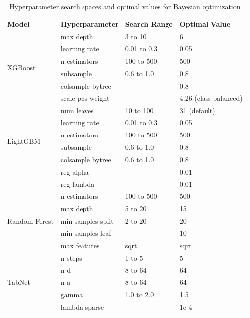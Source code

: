\documentclass[harvard,article]{frontiersinFPHY_FAMS}
\begin{document}
\begin{table}[H]
\centering
\caption{Hyperparameter search spaces and optimal values for Bayesian optimization}
\label{tab:hyperparameters}
\begin{tabular}{l l l l}
\toprule
\textbf{Model} & \textbf{Hyperparameter} & \textbf{Search Range} & \textbf{Optimal Value} \\
\midrule
\multirow{6}{*}{XGBoost} & max depth & 3 to 10 & 6 \\
 & learning rate & 0.01 to 0.3 & 0.05 \\
 & n estimators & 100 to 500 & 500 \\
 & subsample & 0.6 to 1.0 & 0.8 \\
 & colsample bytree & - & 0.8 \\
 & scale pos weight & - & 4.26 (class-balanced) \\
\midrule
\multirow{6}{*}{LightGBM} & num leaves & 10 to 100 & 31 (default) \\
 & learning rate & 0.01 to 0.3 & 0.05 \\
 & n estimators & 100 to 500 & 500 \\
 & subsample & 0.6 to 1.0 & 0.8 \\
 & colsample bytree & 0.6 to 1.0 & 0.8 \\
 & reg alpha & - & 0.01 \\
 & reg lambda & - & 0.01 \\
\midrule
\multirow{5}{*}{Random Forest} & n estimators & 100 to 500 & 500 \\
 & max depth & 5 to 20 & 15 \\
 & min samples split & 2 to 20 & 20 \\
 & min samples leaf & - & 10 \\
 & max features & sqrt & sqrt \\
\midrule
\multirow{5}{*}{TabNet} & n steps & 1 to 5 & 5 \\
 & n d & 8 to 64 & 64 \\
 & n a & 8 to 64 & 64 \\
 & gamma & 1.0 to 2.0 & 1.5 \\
 & lambda sparse & - & 1e-4 \\
\bottomrule
\end{tabular}
\end{table}
\end{document}
